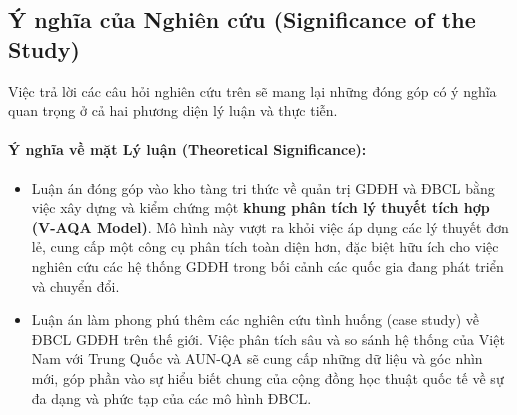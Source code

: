 \documentclass[12pt, a4paper, openany]{report}
\begin{document}
\subsection{Ý nghĩa của Nghiên cứu (Significance of the Study)}
\label{subsec:y_nghia_nghien_cuu}

Việc trả lời các câu hỏi nghiên cứu trên sẽ mang lại những đóng góp có ý nghĩa quan trọng ở cả hai phương diện lý luận và thực tiễn.

\paragraph{Ý nghĩa về mặt Lý luận (Theoretical Significance):}
\begin{itemize}
    \item Luận án đóng góp vào kho tàng tri thức về quản trị GDĐH và ĐBCL bằng việc xây dựng và kiểm chứng một \textbf{khung phân tích lý thuyết tích hợp (V-AQA Model)}. Mô hình này vượt ra khỏi việc áp dụng các lý thuyết đơn lẻ, cung cấp một công cụ phân tích toàn diện hơn, đặc biệt hữu ích cho việc nghiên cứu các hệ thống GDĐH trong bối cảnh các quốc gia đang phát triển và chuyển đổi.
    \item Luận án làm phong phú thêm các nghiên cứu tình huống (case study) về ĐBCL GDĐH trên thế giới. Việc phân tích sâu và so sánh hệ thống của Việt Nam với Trung Quốc và AUN-QA sẽ cung cấp những dữ liệu và góc nhìn mới, góp phần vào sự hiểu biết chung của cộng đồng học thuật quốc tế về sự đa dạng và phức tạp của các mô hình ĐBCL.
\end{itemize}
\end{document}
